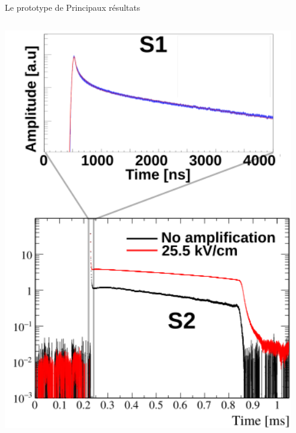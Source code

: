 \begin{frame}{Le prototype de \TOO{}}{Principaux résultats}
\begin{scriptsize}
\begin{columns}
               	\begin{column}{0.5\textwidth}
                   	\flushright\includegraphics[width=0.95\textwidth]{./pictures/scintillation.png}
               	\end{column}
           	\end{columns}
       	\end{scriptsize}
   	\end{frame}
	    
